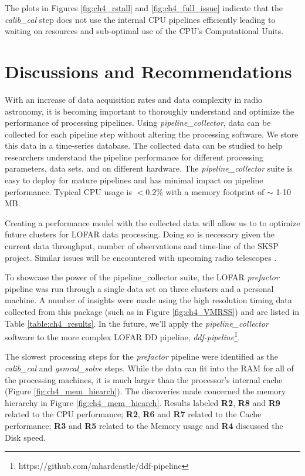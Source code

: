 The plots in Figures \ref{fig:ch4_rstall} and \ref{fig:ch4_full_issue} indicate that the \textit{calib\_cal} step does not use the internal CPU pipelines efficiently leading to waiting on resources and sub-optimal use of the CPU's Computational Units.

\section{Discussions and Recommendations}

With an increase of data acquisition rates and data complexity in radio astronomy, it is becoming important to thoroughly understand and optimize the performance of processing pipelines. Using \textit{pipeline\_collector}, data can be collected for each pipeline step without altering the processing software. We store this data in a time-series database. The collected data can be studied to help researchers understand the pipeline performance for different processing parameters, data sets, and on different hardware. The \textit{pipeline\_collector} suite is easy to deploy for mature pipelines and has minimal impact on pipeline performance. Typical CPU usage is $<$0.2\% with a memory footprint of $\sim$ 1-10 MB.

Creating a performance model with the collected data will allow us to to optimize future clusters for LOFAR data processing. Doing so is necessary given the current data throughput, number of observations and time-line of the SKSP project. Similar issues will be encountered with upcoming radio telescopes \citep{meerkat_ska_size}.


To showcase the power of the pipeline\_collector suite, the LOFAR \textit{prefactor} pipeline was run through a single data set on three clusters and a personal machine. A number of insights were made using the high resolution timing data collected from this package (such as in Figure \ref{fig:ch4_VMRSS}) and are listed in Table \ref{table:ch4_results}. In the future, we'll apply the \textit{pipeline\_collector} software to the more complex LOFAR DD pipeline, \textit{ddf-pipeline}\footnote{https://github.com/mhardcastle/ddf-pipeline}. 

The slowest processing steps for the \textit{prefactor} pipeline were identified as the \textit{calib\_cal} and \textit{gsmcal\_solve} steps. While the data can fit into the RAM for all of the processing machines, it is much larger than the processor's internal cache (Figure \ref{fig:ch4_mem_hiearch}).  The discoveries made concerned the memory hierarchy in Figure \ref{fig:ch4_mem_hiearch}. Results labeled \textbf{R2}, \textbf{R8} and \textbf{R9} related to the CPU performance; \textbf{R2}, \textbf{R6} and \textbf{R7} related to the Cache performance; \textbf{R3} and \textbf{R5} related to the Memory usage and \textbf{R4} discussed the Disk speed. 

